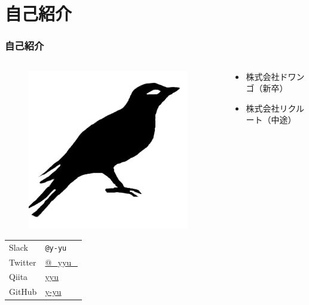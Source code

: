\section{自己紹介}
\begin{frame}
  \frametitle{自己紹介}
  
  \begin{columns}
    \begin{column}{0.3\textwidth}
      \begin{center}
        \begin{figure}[h]
          \includegraphics[width=0.95\textwidth]{img/bird.png}%
        \end{figure}
      \end{center}
 
      \begin{table}[h]
        \begin{tabular}{ll}
          Slack & \texttt{@y-yu} \\
          Twitter & \href{https://twitter.com/\_yyu\_}{@\_yyu\_} \\
          Qiita &  \href{https://qiita.com/yyu}{yyu} \\
          GitHub &  \href{https://github.com/y-yu}{y-yu}
        \end{tabular}
      \end{table}
    \end{column}
    \begin{column}{0.7\textwidth}
      \begin{itemize}
        \item 株式会社ドワンゴ（新卒）
        \item 株式会社リクルート（中途）


\end{itemize}
\end{column}
\end{columns}
\end{frame}
